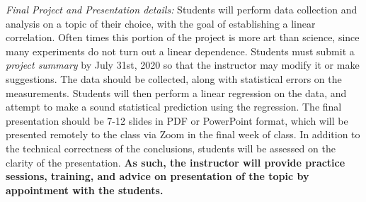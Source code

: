 \documentclass[10pt]{article}
\begin{document}
\begin{outline}[enumerate]
\1 \textit{Final Project and Presentation details:}
Students will perform data collection and analysis on a topic of their choice, with the goal of establishing a linear correlation.  Often times this portion of the project is more art than science, since many experiments do not turn out a linear dependence.  Students must submit a \textit{project summary} by July 31st, 2020 so that the instructor may modify it or make suggestions.  The data should be collected, along with statistical errors on the measurements.  Students will then perform a linear regression on the data, and attempt to make a sound statistical prediction using the regression.  The final presentation should be 7-12 slides in PDF or PowerPoint format, which will be presented remotely to the class via Zoom in the final week of class.  In addition to the technical correctness of the conclusions, students will be assessed on the clarity of the presentation.  \textbf{As such, the instructor will provide practice sessions, training, and advice on presentation of the topic by appointment with the students.}
\end{outline}
\end{document}
